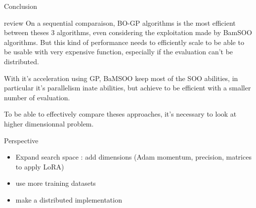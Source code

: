 \begin{frame}{Conclusion}

\begin{block}{review}
    On a sequential comparaison, BO-GP algorithms is the most efficient between theses 3 algorithms, even considering the exploitation made by BamSOO algorithms. But this kind of performance needs to efficiently scale to be able to be usable with very expensive function, especially if the evaluation can't be distributed. 

    With it's acceleration using GP, BaMSOO keep most of the SOO abilities, in particular it's parallelism inate abilities, but achieve to be efficient with a smaller number of evaluation. 

    To be able to effectively compare theses approaches, it's necessary to look at higher dimensionnal problem. 
    
\end{block}

\begin{block}{Perspective}
    \begin{itemize}
        \item Expand search space : add dimensions (Adam momentum, precision, matrices to apply LoRA)
        \item use more training datasets
        \item make a distributed implementation
    \end{itemize}
    
\end{block}


\end{frame}
